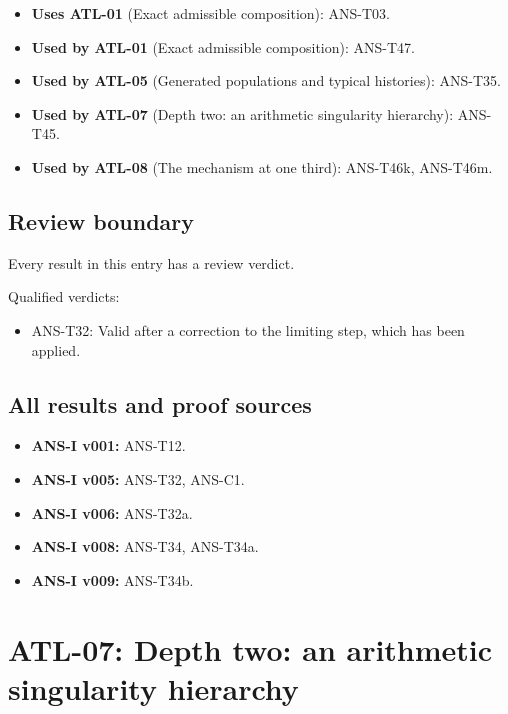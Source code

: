 \documentclass[
  11pt,
]{article}
\providecommand{\tightlist}{%
  \setlength{\itemsep}{0pt}\setlength{\parskip}{0pt}}
\begin{document}
\begin{itemize}
\tightlist
\item
  \textbf{Uses ATL-01} (Exact admissible composition): ANS-T03.
\item
  \textbf{Used by ATL-01} (Exact admissible composition): ANS-T47.
\item
  \textbf{Used by ATL-05} (Generated populations and typical histories):
  ANS-T35.
\item
  \textbf{Used by ATL-07} (Depth two: an arithmetic singularity
  hierarchy): ANS-T45.
\item
  \textbf{Used by ATL-08} (The mechanism at one third): ANS-T46k,
  ANS-T46m.
\end{itemize}

\hypertarget{review-boundary-5}{%
\subsection{Review boundary}\label{review-boundary-5}}

Every result in this entry has a review verdict.

Qualified verdicts:

\begin{itemize}
\tightlist
\item
  ANS-T32: Valid after a correction to the limiting step, which has been
  applied.
\end{itemize}

\hypertarget{all-results-and-proof-sources-5}{%
\subsection{All results and proof
sources}\label{all-results-and-proof-sources-5}}

\begin{itemize}
\tightlist
\item
  \textbf{ANS-I v001:} ANS-T12.
\item
  \textbf{ANS-I v005:} ANS-T32, ANS-C1.
\item
  \textbf{ANS-I v006:} ANS-T32a.
\item
  \textbf{ANS-I v008:} ANS-T34, ANS-T34a.
\item
  \textbf{ANS-I v009:} ANS-T34b.
\end{itemize}

\hypertarget{atl-07-depth-two-an-arithmetic-singularity-hierarchy}{%
\section{ATL-07: Depth two: an arithmetic singularity
hierarchy}\label{atl-07-depth-two-an-arithmetic-singularity-hierarchy}}
\end{document}
